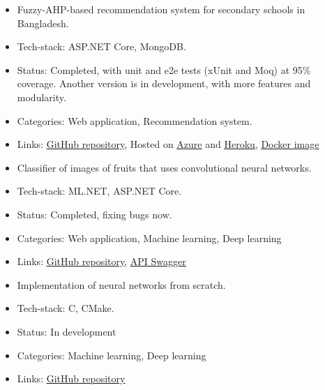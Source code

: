 \begin{itemize}
\item Fuzzy-AHP-based recommendation system for secondary schools in Bangladesh.
\item Tech-stack: ASP.NET Core, MongoDB.
\item Status: Completed, with unit and e2e tests (xUnit and Moq) at 95\% coverage. Another version is in development, with more features and modularity.
\item Categories: Web application, Recommendation system.
\item Links: \href{https://github.com/maacpiash/KonSchool}{\underline{GitHub repository}}, Hosted on  \href{https://konschool.azurewebsites.net/}{\underline{Azure}} and \href{https://konschool.herokuapp.com}{\underline{Heroku}}, \href{https://hub.docker.com/r/maacpiash/konschool}{\underline{Docker image}}
\end{itemize}
\smallskip
{}
\begin{itemize}
\item Classifier of images of fruits that uses convolutional neural networks.
\item Tech-stack: ML.NET, ASP.NET Core.
\item Status: Completed, fixing bugs now.
\item Categories: Web application, Machine learning, Deep learning
\item Links: \href{https://github.com/maacpiash/Connery}{\underline{GitHub repository}}, \href{https://connery-api.herokuapp.com}{\underline{API Swagger}}
\end{itemize}
\smallskip
{}
\begin{itemize}
\item Implementation of neural networks from scratch.
\item Tech-stack: C, CMake.
\item Status: In development
\item Categories: Machine learning, Deep learning
\item Links: \href{https://github.com/maacpiash/Winston}{\underline{GitHub repository}}
\end{itemize}
\smallskip
\cvproject{}
